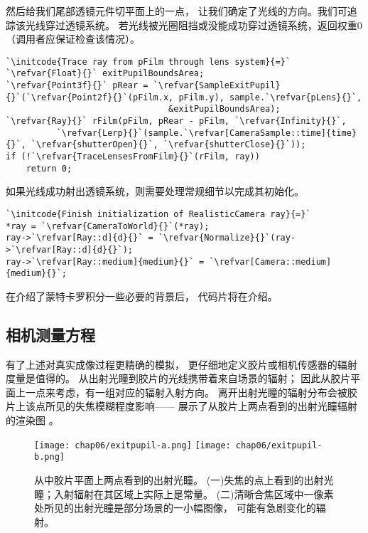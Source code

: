 然后给我们尾部透镜元件切平面上的一点，
让我们确定了光线的方向。我们可追踪该光线穿过透镜系统。
若光线被光圈阻挡或没能成功穿过透镜系统，返回权重0
（调用者应保证检查该情况）。
\begin{lstlisting}
`\initcode{Trace ray from pFilm through lens system}{=}`
`\refvar{Float}{}` exitPupilBoundsArea;
`\refvar{Point3f}{}` pRear = `\refvar{SampleExitPupil}{}`(`\refvar{Point2f}{}`(pFilm.x, pFilm.y), sample.`\refvar{pLens}{}`,
                                &exitPupilBoundsArea);
`\refvar{Ray}{}` rFilm(pFilm, pRear - pFilm, `\refvar{Infinity}{}`,
          `\refvar{Lerp}{}`(sample.`\refvar[CameraSample::time]{time}{}`, `\refvar{shutterOpen}{}`, `\refvar{shutterClose}{}`));
if (!`\refvar{TraceLensesFromFilm}{}`(rFilm, ray))
    return 0;
\end{lstlisting}

如果光线成功射出透镜系统，则需要处理常规细节以完成其初始化。
\begin{lstlisting}
`\initcode{Finish initialization of RealisticCamera ray}{=}`
*ray = `\refvar{CameraToWorld}{}`(*ray);
ray->`\refvar[Ray::d]{d}{}` = `\refvar{Normalize}{}`(ray->`\refvar[Ray::d]{d}{}`);
ray->`\refvar[Ray::medium]{medium}{}` = `\refvar[Camera::medium]{medium}{}`;
\end{lstlisting}

在介绍了蒙特卡罗积分一些必要的背景后，
代码片将在介绍。

\subsection{相机测量方程}\label{sub:相机测量方程}
有了上述对真实成像过程更精确的模拟，
更仔细地定义胶片或相机传感器的辐射度量是值得的。
从出射光瞳到胶片的光线携带着来自场景的辐射；
因此从胶片平面上一点来考虑，有一组对应的辐射入射方向。
离开出射光瞳的辐射分布会被胶片上该点所见的失焦模糊程度影响——
展示了从胶片上两点看到的出射光瞳辐射的渲染图
。
\begin{figure}[htbp]
    \centering
    \texttt{[image: chap06/exitpupil-a.png]}\quad
    \texttt{[image: chap06/exitpupil-b.png]}
    \caption{从中胶片平面上两点看到的出射光瞳。
        (一)失焦的点上看到的出射光瞳；入射辐射在其区域上实际上是常量。
        (二)清晰合焦区域中一像素处所见的出射光瞳是部分场景的一小幅图像，
        可能有急剧变化的辐射。}
    \label{fig:6.24}
\end{figure}

